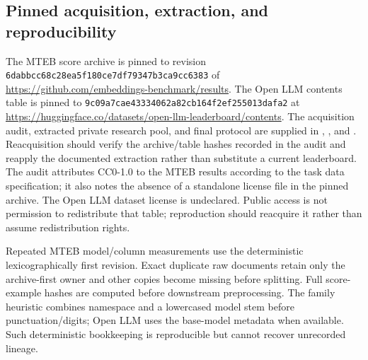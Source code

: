 \documentclass{article}
\begin{document}
\subsection{Pinned acquisition, extraction, and reproducibility}
The MTEB score archive is pinned to revision
\texttt{6dabbcc68c28ea5f180c\allowbreak e7df79347b3ca9cc6383}
of \url{https://github.com/embeddings-benchmark/results}.
The Open LLM contents table is pinned to
\texttt{9c09a7cae43334062a82\allowbreak cb164f2ef255013dafa2}
at \url{https://huggingface.co/datasets/open-llm-leaderboard/contents}.
The acquisition audit, extracted private research pool, and final protocol are supplied in , , and . Reacquisition should verify the archive/table hashes recorded in the audit and reapply the documented extraction rather than substitute a current leaderboard. The audit attributes CC0-1.0 to the MTEB results according to the task data specification; it also notes the absence of a standalone license file in the pinned archive. The Open LLM dataset license is undeclared. Public access is not permission to redistribute that table; reproduction should reacquire it rather than assume redistribution rights.

Repeated MTEB model/column measurements use the deterministic lexicographically first revision. Exact duplicate raw documents retain only the archive-first owner and other copies become missing before splitting. Full score-example hashes are computed before downstream preprocessing. The family heuristic combines namespace and a lowercased model stem before punctuation/digits; Open LLM uses the base-model metadata when available. Such deterministic bookkeeping is reproducible but cannot recover unrecorded lineage.
\end{document}
